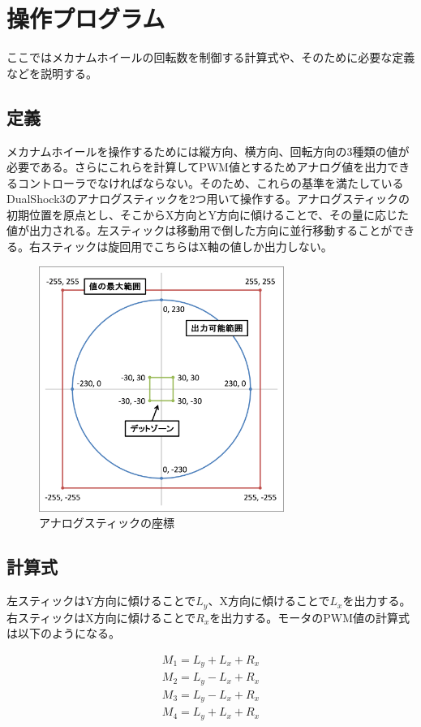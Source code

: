 \documentclass[12pt,oneside]{sotsuken_paper}
\begin{document}
	\section{操作プログラム}
	ここではメカナムホイールの回転数を制御する計算式や、そのために必要な定義などを説明する。

		\subsection{定義}
		メカナムホイールを操作するためには縦方向、横方向、回転方向の3種類の値が必要である。さらにこれらを計算してPWM値とするためアナログ値を出力できるコントローラでなければならない。そのため、これらの基準を満たしているDualShock3のアナログスティックを2つ用いて操作する。アナログスティックの初期位置を原点とし、そこからX方向とY方向に傾けることで、その量に応じた値が出力される。左スティックは移動用で倒した方向に並行移動することができる。右スティックは旋回用でこちらはX軸の値しか出力しない。

		\begin{figure}[htp]
			\begin{center}
				\includegraphics[width=80mm]{Image/座標.png}
				\caption{アナログスティックの座標}
				\label{座標}
			\end{center}
		\end{figure}

		\subsection{計算式}
		左スティックはY方向に傾けることで$L_y$、X方向に傾けることで$L_x$を出力する。右スティックはX方向に傾けることで$R_x$を出力する。モータのPWM値の計算式は以下のようになる。

		\begin{eqnarray}
		M_1 = L_y + L_x + R_x \\
		M_2 = L_y - L_x + R_x \\
		M_3 = L_y - L_x + R_x \\
		M_4 = L_y + L_x + R_x
		\end{eqnarray}
\end{document}
